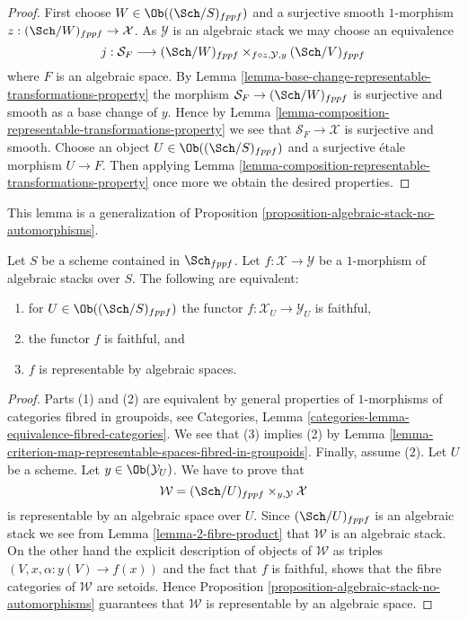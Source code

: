 \begin{proof}
First choose $W \in \Ob((\Sch/S)_{fppf})$ and a surjective
smooth $1$-morphism $z : (\Sch/W)_{fppf} \to \mathcal{X}$.
As $\mathcal{Y}$ is an algebraic stack we may choose an equivalence
$$
j :
\mathcal{S}_F
\longrightarrow
(\Sch/W)_{fppf}
\times_{f \circ z, \mathcal{Y}, y}
(\Sch/V)_{fppf}
$$
where $F$ is an algebraic space. By
Lemma \ref{lemma-base-change-representable-transformations-property}
the morphism
$\mathcal{S}_F \to (\Sch/W)_{fppf}$ is surjective and smooth
as a base change of $y$. Hence by
Lemma \ref{lemma-composition-representable-transformations-property}
we see that $\mathcal{S}_F \to \mathcal{X}$ is surjective and smooth.
Choose an object $U \in \Ob((\Sch/S)_{fppf})$
and a surjective \'etale morphism $U \to F$. Then applying
Lemma \ref{lemma-composition-representable-transformations-property}
once more we obtain the desired properties.
\end{proof}

\noindent
This lemma is a generalization of
Proposition \ref{proposition-algebraic-stack-no-automorphisms}.

\begin{lemma}
\label{lemma-characterize-representable-by-algebraic-spaces}
Let $S$ be a scheme contained in $\Sch_{fppf}$.
Let $f : \mathcal{X} \to \mathcal{Y}$ be a $1$-morphism of algebraic
stacks over $S$. The following are equivalent:
\begin{enumerate}
\item for $U \in \Ob((\Sch/S)_{fppf})$
the functor $f : \mathcal{X}_U \to \mathcal{Y}_U$ is faithful,
\item the functor $f$ is faithful, and
\item $f$ is representable by algebraic spaces.
\end{enumerate}
\end{lemma}

\begin{proof}
Parts (1) and (2) are equivalent by general properties of $1$-morphisms
of categories fibred in groupoids, see
Categories, Lemma \ref{categories-lemma-equivalence-fibred-categories}.
We see that (3) implies (2) by
Lemma \ref{lemma-criterion-map-representable-spaces-fibred-in-groupoids}.
Finally, assume (2).
Let $U$ be a scheme. Let $y \in \Ob(\mathcal{Y}_U)$.
We have to prove that
$$
\mathcal{W} = (\Sch/U)_{fppf} \times_{y, \mathcal{Y}} \mathcal{X}
$$
is representable by an algebraic space over $U$. Since
$(\Sch/U)_{fppf}$ is an algebraic stack we see from
Lemma \ref{lemma-2-fibre-product}
that $\mathcal{W}$ is an algebraic stack.
On the other hand the explicit description of objects of $\mathcal{W}$
as triples $(V, x, \alpha : y(V) \to f(x))$ and the fact that $f$ is
faithful, shows that the fibre categories of $\mathcal{W}$ are setoids. Hence
Proposition \ref{proposition-algebraic-stack-no-automorphisms}
guarantees that $\mathcal{W}$ is representable by an algebraic space.
\end{proof}

